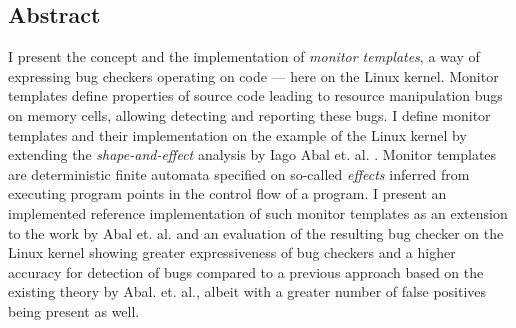 \subsection*{Abstract}

I present the concept and the implementation of \emph{monitor templates}, a way of expressing bug checkers operating on code --- here on the Linux kernel. Monitor templates define properties of source code leading to resource manipulation bugs on memory cells, allowing detecting and reporting these bugs. I define monitor templates and their implementation on the example of the Linux kernel by extending the \textit{shape-and-effect} analysis by Iago Abal et. al. \cite{Abal2017EffectiveBF}. Monitor templates are deterministic finite automata specified on so-called \textit{effects} inferred from executing program points in the control flow of a program. I present an implemented reference implementation of such monitor templates as an extension to the work by Abal et. al. and an evaluation of the resulting bug checker on the Linux kernel showing greater expressiveness of bug checkers and a higher accuracy for detection of bugs compared to a previous approach based on the existing theory by Abal. et. al.\cite{research-project}, albeit with a greater number of false positives being present as well.  